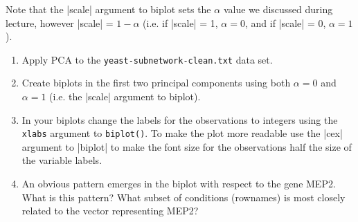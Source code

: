 Note that the |scale| argument to biplot sets the $\alpha$ value we discussed during lecture, however |scale| = $1-\alpha$ (i.e. if |scale| = 1, $\alpha=0$, and if |scale| = 0, $\alpha=1$).

\medskip
\begin{assignment}
\begin{enumerate}
  \item Apply PCA to the \verb|yeast-subnetwork-clean.txt| data set.
  \item Create biplots in the first two principal components using both $\alpha=0$ and $\alpha=1$ (i.e. the |scale| argument to biplot).
  \item In your biplots change the labels for the observations to integers using the \verb|xlabs| argument to \verb|biplot()|. To make the plot more readable use the |cex| argument to |biplot| to make the font size for the observations half the size of the variable labels.
  \item An obvious pattern emerges in the biplot with respect to the gene MEP2. What is this pattern? What subset of conditions (rownames) is most closely related to the vector representing MEP2?
\end{enumerate}
\end{assignment}







